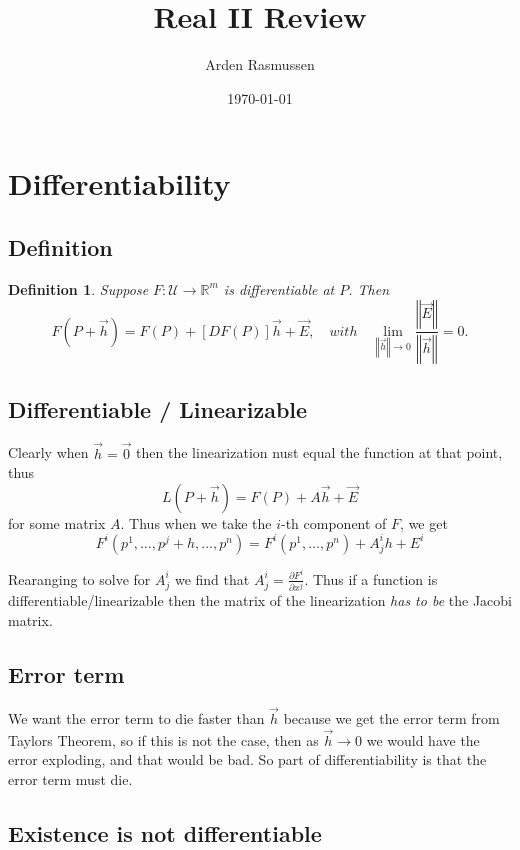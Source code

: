 \documentclass[12pt]{armath}
\title{Real II Review}
\author{Arden Rasmussen}
\date{\today}
\newtheorem{definition}{Definition}[section]
\newcommand{\U}{\mathcal{U}}
\newcommand{\ra}{\rightarrow}
\newcommand{\R}{\mathbb{R}}
\newcommand{\aabs}[1]{\left\Vert{#1}\right\Vert}
\newcommand{\pder}[2]{\frac{\partial #1}{\partial #2}}
\begin{document}
\maketitle

\section{Differentiability}%
\label{sec:differentiability}

\subsection{Definition}%
\label{sub:definition}

\begin{definition}
  Suppose $F:\U\ra\R^m$ is differentiable at $P$. Then
  \[
    F(P+\vec{h})=F(P)+[DF(P)]\vec{h}+\vec{E},\quad with\quad
    \lim_{\aabs{\vec{h}}\ra 0}\frac{\aabs{\vec{E}}}{\aabs{\vec{h}}}=0.
  \]
\end{definition}

\subsection{Differentiable / Linearizable}%
\label{sub:differentiable_linearizable}

Clearly when $\vec{h}=\vec{0}$ then the linearization nust equal the function
at that point, thus \[L(P+\vec{h})=F(P)+A\vec{h}+\vec{E}\] for some matrix $A$.
Thus when we take the $i$-th component of $F$, we get
\[
  F^i(p^1,\ldots,p^j+h,\ldots,p^n)=F^i(p^1,\ldots,p^n)+A_j^ih+E^i
\]

Rearanging to solve for $A_j^i$ we find that $A_j^i=\pder{F^i}{x^j}$. Thus if a
function is differentiable/linearizable then the matrix of the linearization
\textit{has to be} the Jacobi matrix.

\subsection{Error term}%
\label{sub:error_term}

We want the error term to die faster than $\vec{h}$ because we get the error
term from Taylors Theorem, so if this is not the case, then as $\vec{h}\ra0$ we
would have the error exploding, and that would be bad. So part of
differentiability is that the error term must die.

\subsection{Existence is not differentiable}%
\label{sub:existance_is_not_differentiable}
\end{document}
